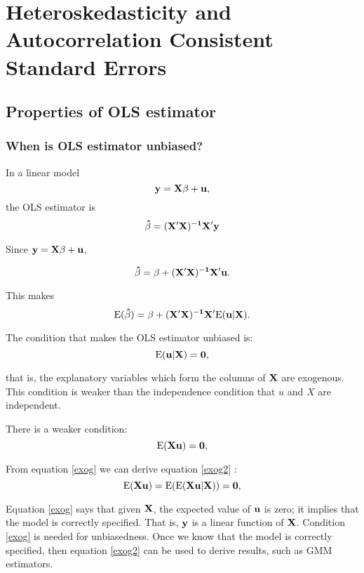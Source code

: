 \chapter{Heteroskedasticity and Autocorrelation Consistent Standard Errors}

\section{Properties of OLS estimator}

\subsection{When is OLS estimator unbiased?}

In a linear model 
\begin{equation}
\bf y=X\beta+u, 
\end{equation}
 the OLS estimator is
\begin{equation*}
\bf \hat \beta=(X'X)^{-1}X'y
\end{equation*}

Since $\bf y=X \beta+u$,

\begin{equation}
\bf \hat \beta=\beta + (X'X)^{-1}X'u.
\end{equation}

This makes
\begin{equation}
{\rm E} \bf (\hat \beta)=\beta + (X'X)^{-1}X'{\rm E} (u|X).
\end{equation}

The condition that makes the OLS estimator unbiased is:
\begin{equation}
{\rm E} \bf (u|X)=0,
\label{exog}
\end{equation}

that is, the explanatory variables which form the columns of $\bf X$
are exogenous.  This condition is weaker than the independence
condition that $u$ and $X$ are independent.

There is a weaker condition: 
\begin{equation}
{\rm E} \bf (X u)=0,
\label{exog2}
\end{equation}

From equation \ref{exog} we can derive equation \ref{exog2}
:\begin{equation}
{\rm E} \bf (X u)= {\rm E}( {\rm E} {\bf (X u | X)})= 0,
\end{equation}

Equation \ref{exog} says that given $\bf X$, the expected value of
$\bf u$ is zero; it implies that the model is correctly specified.
That is, $\bf y$ is a linear function of $\bf X$.  Condition
\ref{exog} is needed for unbiasedness.  Once we know that the model is
correctly specified, then equation \ref{exog2} can be used to derive
results, such as GMM estimators.


